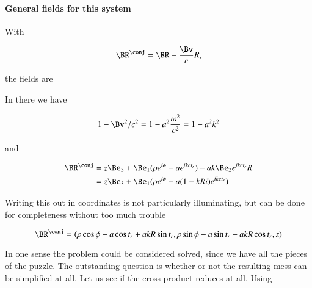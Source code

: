 {\paragraph{General fields for this system}

With

\begin{equation}\label{eqn:relativisticElectrodynamicsExamReflection:540}
\BR^\conj = \BR - \frac{\Bv}{c} R,
\end{equation}

the fields are


In there we have

\begin{equation}\label{eqn:relativisticElectrodynamicsExamReflection:580}
1 - \Bv^2/c^2 = 1 - a^2 \frac{\omega^2}{c^2} = 1 - a^2 k^2
\end{equation}

and

\begin{equation}\label{eqn:relativisticElectrodynamicsExamReflection:1090}
\begin{aligned}
\BR^\conj
&=
z \Be_3 + \Be_1 (\rho e^{i \phi} - a e^{i k c t_r} )
-
a k \Be_2 e^{i k c t_r} R \\
&=
z \Be_3 + \Be_1 (\rho e^{i \phi} - a (1 - k R i) e^{i k c t_r} )
\end{aligned}
\end{equation}

Writing this out in coordinates is not particularly illuminating, but can be done for completeness without too much trouble

\begin{equation}\label{eqn:relativisticElectrodynamicsExamReflection:600}
\BR^\conj =
( \rho \cos\phi - a \cos t_r + a k R \sin t_r,
  \rho \sin\phi - a \sin t_r - a k R \cos t_r,
  z )
\end{equation}

In one sense the problem could be considered solved, since we have all the pieces of the puzzle.  The outstanding question is whether or not the resulting mess can be simplified at all.  Let us see if the cross product reduces at all.  Using

}
